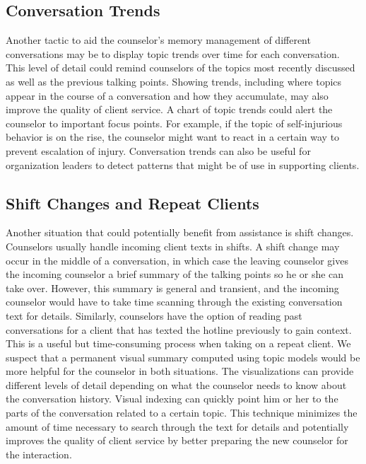\subsection{Conversation Trends}

Another tactic to aid the counselor's memory management of different conversations
may be to display topic trends over time for each conversation. This level of detail
could remind counselors of the topics most recently discussed as well as the previous
talking points. Showing trends, including where topics appear in the course of a
conversation and how they accumulate, may also improve the quality of client service.
A chart of topic trends could alert the counselor to important focus points. For
example, if the topic of self-injurious behavior is on the rise, the counselor might
want to react in a certain way to prevent escalation of injury. Conversation trends
can also be useful for organization leaders to detect patterns that might be of use in
supporting clients.

\subsection{Shift Changes and Repeat Clients}

Another situation that could potentially benefit from assistance is shift changes.
Counselors usually handle incoming client texts in shifts. A shift change may
occur in the middle of a conversation, in which case the leaving counselor gives the
incoming counselor a brief summary of the talking points so he or she can take over.
However, this summary is general and transient, and the incoming counselor would
have to take time scanning through the existing conversation text for details.
Similarly, counselors have the option of reading past conversations for a client that has
texted the hotline previously to gain context. This is a useful but time-consuming
process when taking on a repeat client. We suspect that a permanent visual summary
computed using topic models would be more helpful for the counselor in both
situations. The visualizations can provide different levels of detail depending on what
the counselor needs to know about the conversation history. Visual indexing can
quickly point him or her to the parts of the conversation related to a certain topic.
This technique minimizes the amount of time necessary to search through the text
for details and potentially improves the quality of client service by better preparing
the new counselor for the interaction.

